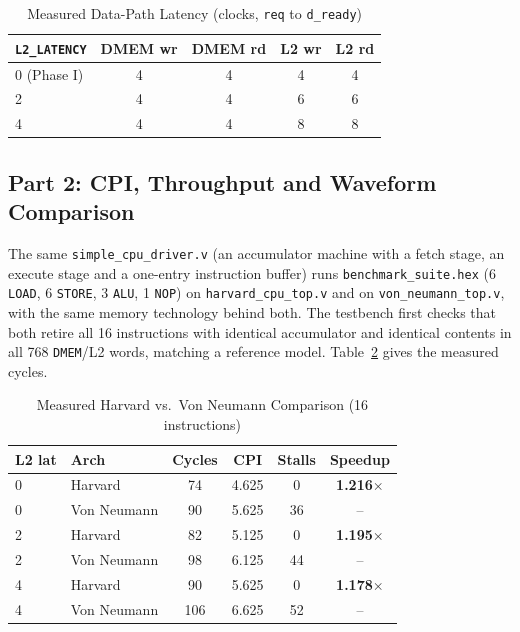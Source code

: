 \documentclass[conference]{IEEEtran}
\begin{document}
\begin{table}[htbp]
\caption{Measured Data-Path Latency (clocks, \texttt{req} to \texttt{d\_ready})}\label{tab:lat}
\begin{center}
\begin{tabular}{@{}lcccc@{}}
\toprule
\texttt{L2\_LATENCY} & DMEM wr & DMEM rd & L2 wr & L2 rd \\
\midrule
0 (Phase I) & 4 & 4 & 4 & 4 \\
2 & 4 & 4 & 6 & 6 \\
4 & 4 & 4 & 8 & 8 \\
\bottomrule
\end{tabular}
\end{center}
\end{table}

\subsection{Part 2: CPI, Throughput and Waveform Comparison}
The same \texttt{simple\_cpu\_driver.v} (an accumulator machine with a fetch stage, an execute stage and a one-entry instruction buffer) runs \texttt{benchmark\_suite.hex} (6 \texttt{LOAD}, 6 \texttt{STORE}, 3 \texttt{ALU}, 1 \texttt{NOP}) on \texttt{harvard\_cpu\_top.v} and on \texttt{von\_neumann\_top.v}, with the same memory technology behind both. The testbench first checks that both retire all 16 instructions with identical accumulator and identical contents in all 768 \texttt{DMEM}/L2 words, matching a reference model. Table~\ref{tab:cmp} gives the measured cycles.

\begin{table}[htbp]
\caption{Measured Harvard vs.\ Von Neumann Comparison (16 instructions)}\label{tab:cmp}
\begin{center}
\begin{tabular}{@{}llcccc@{}}
\toprule
L2 lat & Arch & Cycles & CPI & Stalls & Speedup \\
\midrule
0 & Harvard & 74 & 4.625 & 0 & \textbf{1.216$\times$} \\
0 & Von Neumann & 90 & 5.625 & 36 & -- \\
2 & Harvard & 82 & 5.125 & 0 & \textbf{1.195$\times$} \\
2 & Von Neumann & 98 & 6.125 & 44 & -- \\
4 & Harvard & 90 & 5.625 & 0 & \textbf{1.178$\times$} \\
4 & Von Neumann & 106 & 6.625 & 52 & -- \\
\bottomrule
\end{tabular}
\end{center}
\end{table}
\end{document}
